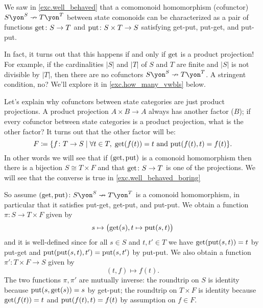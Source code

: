 \documentclass[Book-Poly]{subfiles}
\begin{document}
\begin{example}\label{ex.well_behaved_boring}
We saw in \cref{exc.well_behaved} that a comomonoid homomorphism (cofunctor) $S\yon^S\cof T\yon^T$ between state comonoids can be characterized as a pair of functions $\mathrm{get}\colon S\to T$ and $\mathrm{put}\colon S\times T\to S$ satisfying get-put, put-get, and put-put. 

In fact, it turns out that this happens if and only if $\mathrm{get}$ is a product projection! For example, if the cardinalities $|S|$ and $|T|$ of $S$ and $T$ are finite and $|S|$ is not divisible by $|T|$, then there are no cofunctors $S\yon^S\cof T\yon^T$. A stringent condition, no? We'll explore it in  \cref{exc.how_many_vwbls} below.

Let's explain why cofunctors between state categories are just product projections. A product projection $A\times B\to A$ always has another factor ($B$); if every cofunctor between state categories is a product projection, what is the other factor? It turns out that the other factor will be:
\[
F\coloneqq\{f\colon T\to S\mid \forall t\in T,\;\mathrm{get}(f(t))=t\text{ and }\mathrm{put}(f(t),t)=f(t)\}.
\]
In other words we will see that if $(\mathrm{get},\mathrm{put})$ is a comonoid homomorphism then there is a bijection $S\cong T\times F$ and that $\mathrm{get}\colon S\to T$ is one of the projections. We will see that the converse is true in \cref{exc.well_behaved_boring}

So assume $(\lensget,\lensput)\colon S\yon^S\cof T\yon^T$ is a comonoid homomorphism, in particular that it satisfies put-get, get-put, and put-put. We obtain a function $\pi\colon S\to T\times F$ given by
\[s\mapsto\big(\mathrm{get}(s),t\mapsto\mathrm{put}(s,t)\big)\]
and it is well-defined since for all $s\in S$ and $t,t'\in T$ we have $\mathrm{get}(\mathrm{put}(s,t))=t$ by put-get and $\mathrm{put}(\mathrm{put}(s,t),t')=\mathrm{put}(s,t')$ by put-put. We also obtain a function $\pi'\colon T\times F\to S$ given by
\[
(t,f)\mapsto f(t).
\]
The two functions $\pi,\pi'$ are mutually inverse: the roundtrip on $S$ is identity because $\mathrm{put}(s,\mathrm{get}(s))=s$ by get-put; the roundtrip on $T\times F$ is identity because $\mathrm{get}(f(t))=t$ and $\mathrm{put}(f(t),t)=f(t)$ by assumption on $f\in F$.
\end{example}
\end{document}
